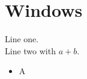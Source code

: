 \documentclass{article}
\begin{document}
\section{Windows}
Line one.\\
Line two with $a+b$.
\begin{itemize}
\item A
\end{itemize}
\end{document}
